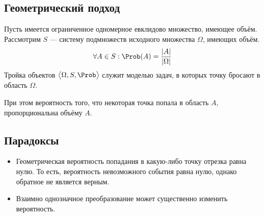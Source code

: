 \subsection{Геометрический подход}
Пусть имеется ограниченное одномерное евклидово множество, имеющее объём. \\
Рассмотрим $S$ --- систему подмножеств исходного множества $\Omega$, имеющих объём.
\[
	\forall A \in S:  \Prob(A) = \frac{\vert {A} \vert}{\vert \Omega \vert}
\]
Тройка объектов $ \big<\Omega, S, \Prob\big> $ служит моделью задач, в которых точку бросают в область $\Omega$.
\smallskip

При этом вероятность того, что некоторая точка попала в область $A$, пропорциональна объёму $A$.
\subsection{Парадоксы}
\begin{itemize}
	\item Геометрическая вероятность попадания в какую-либо точку отрезка равна нулю.
	      То есть, вероятность невозможного события равна нулю, однако обратное не является верным.
	\item Взаимно однозначное преобразование может существенно изменить вероятность.
\end{itemize}
